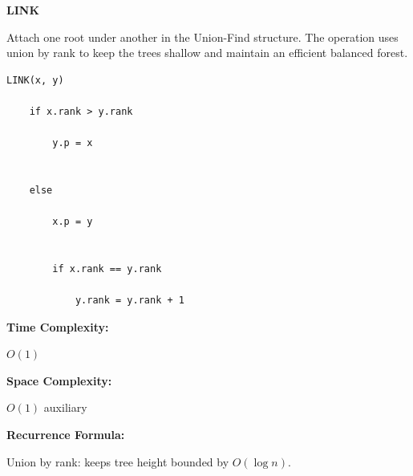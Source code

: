 \documentclass[a4paper,12pt]{article}
\begin{document}
\begin{tcolorbox}[
    colback=gray!30,
    colframe=black,
    boxrule=1pt,
    arc=0mm
]

\begin{tcolorbox}[
    colback=gray!10,
    colframe=black,
    arc=0mm
]
\centering
{\Huge\bfseries LINK}
\end{tcolorbox}


\begin{tcolorbox}[
    colback=gray!10,
    colframe=black,
    arc=0mm
]
\small
Attach one root under another in the Union-Find structure.
The operation uses union by rank to keep the trees shallow and maintain
an efficient balanced forest.
\end{tcolorbox}


\begin{tcolorbox}[
    colback=black!5,
    colframe=black,
    arc=0mm,
    title=Pseudo-code
]
\tiny
\begin{lstlisting}
LINK(x, y)

    if x.rank > y.rank

        y.p = x


    else

        x.p = y


        if x.rank == y.rank

            y.rank = y.rank + 1
\end{lstlisting}
\end{tcolorbox}


\begin{tcolorbox}[
    colback=cyan!20,
    colframe=black,
    arc=0mm
]
\small
\textbf{Time Complexity:}

$O(1)$
\end{tcolorbox}


\begin{tcolorbox}[
    colback=violet!20,
    colframe=black,
    arc=0mm
]
\small
\textbf{Space Complexity:}

$O(1)$ auxiliary
\end{tcolorbox}


\begin{tcolorbox}[
    colback=pink!20,
    colframe=black,
    arc=0mm
]
\small
\textbf{Recurrence Formula:}

Union by rank:
keeps tree height bounded by $O(\log n)$.
\end{tcolorbox}

\end{tcolorbox}
\end{document}
